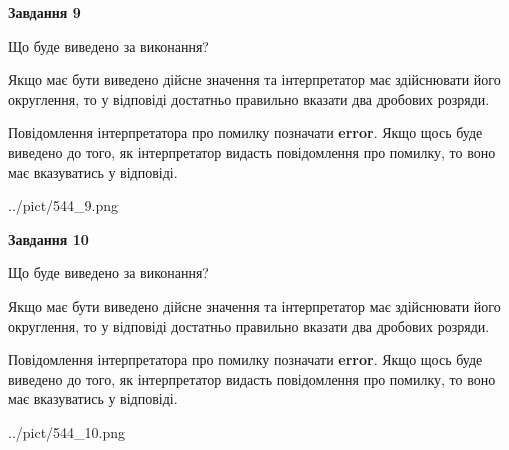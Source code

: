 \documentclass[12pt, ukrainian]{article}
\begin{document}
{\begin {Large}
{\begin {center}\textbf{Завдання 9}\end {center}}\par
Що буде виведено за виконання? \par

Якщо має бути виведено дійсне значення та інтерпретатор має здійснювати його округлення, 
то у відповіді достатньо правильно вказати два дробових розряди.

Повідомлення інтерпретатора про помилку позначати \textbf{error}.
Якщо щось буде виведено до того, як інтерпретатор видасть повідомлення про помилку, 
то воно має вказуватись у відповіді. \par

\begin{center}
	{../pict/544_9.png}
\end{center}
\newpage

{\begin {center}\textbf{Завдання 10}\end {center}}\par
Що буде виведено за виконання? \par

Якщо має бути виведено дійсне значення та інтерпретатор має здійснювати його округлення, 
то у відповіді достатньо правильно вказати два дробових розряди.

Повідомлення інтерпретатора про помилку позначати \textbf{error}.
Якщо щось буде виведено до того, як інтерпретатор видасть повідомлення про помилку, 
то воно має вказуватись у відповіді. \par

\begin{center}
	{../pict/544_10.png}
\end{center}
\newpage

\end {Large}}
\end{document}
